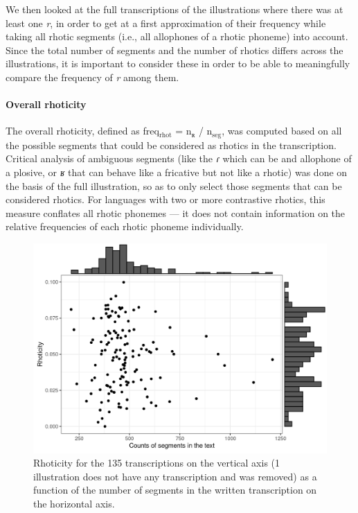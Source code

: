 We then looked at the full transcriptions of the illustrations where there was at least one \textit{r}, in order to get at a first approximation of their frequency while taking all rhotic segments (i.e., all allophones of a rhotic phoneme) into account. Since the total number of segments and the number of rhotics differs across the illustrations, it is important to consider these in order to be able to meaningfully compare the frequency of \textit{r} among them.

\paragraph{Overall rhoticity}

The overall rhoticity, defined as freq$_\textrm{rhot}$ = n$_\textrm{ʀ}$ / n$_\textrm{seg}$, was computed based on all the possible segments that could be considered as rhotics in the transcription. Critical analysis of ambiguous segments (like the \textit{ɾ} which can be and allophone of a plosive, or \textit{ʁ} that can behave like a fricative but not like a rhotic) was done on the basis of the full illustration, so as to only select those segments that can be considered rhotics. For languages with two or more contrastive rhotics, this measure conflates all rhotic phonemes — it does not contain information on the relative frequencies of each rhotic phoneme individually.\\

\begin{figure}
	\centering
	\includegraphics[width=0.75\linewidth]{jipa/images/rhoticy_freq}
	\caption[Rhoticity for the 135 transcriptions as a function of the number of segments in the written transcription]{Rhoticity for the 135 transcriptions on the vertical axis (1 illustration does not have any transcription and was removed) as a function of the number of segments in the written transcription on the horizontal axis.}
	\label{fig:rhoticyfreq}
\end{figure}

